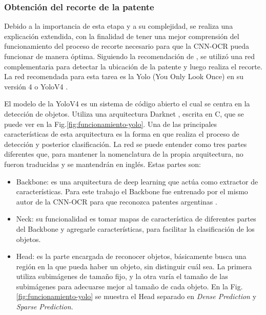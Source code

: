 \subsubsection{Obtención del recorte de la patente}

Debido a la importancia de esta etapa y a su complejidad, se realiza una explicación extendida, con la finalidad de tener una mejor comprensión del funcionamiento del proceso de recorte necesario para que la CNN-OCR pueda funcionar de manera óptima. Siguiendo la recomendación de \cite{ankandrew_reconocedor_2023}, se utilizó una red complementaria para detectar la ubicación de la patente y luego realiza el recorte. La red recomendada para esta tarea es la Yolo (You Only Look Once) en su versión 4 o YoloV4 \cite{bochkovskiy_yolov4_2020}.

El modelo de la YoloV4 es un sistema de código abierto el cual se centra en la detección de objetos. Utiliza una arquitectura Darknet \cite{noauthor_darknet_nodate}, escrita en C, que se puede ver en la Fig.\ref{fig:funcionamiento-yolo}.
Una de las principales características de esta arquitectura es la forma en que realiza el proceso de detección y posterior clasificación. La red se puede entender como tres partes diferentes que, para mantener la nomenclatura de la propia arquitectura, no fueron traducidas y se mantendrán en inglés. Estas partes son:

\begin{itemize}
    \item Backbone: es una arquitectura de deep learning que actúa como extractor de características.
          Para este trabajo el Backbone fue entrenado por el mismo autor de la CNN-OCR para que reconozca patentes argentinas \cite{ankandrew_localizador_2021}.
    \item Neck: su funcionalidad es tomar mapas de característica de diferentes partes del Backbone y agregarle características, para facilitar la clasificación de los objetos.

    \item Head: es la parte encargada de reconocer objetos, básicamente busca una región en la que pueda haber un objeto, sin distinguir cuál sea. La primera utiliza subimágenes de tamaño fijo, y la otra varía el tamaño de las subimágenes para adecuarse mejor al tamaño de cada objeto.
          En la Fig. \ref{fig:funcionamiento-yolo} se muestra el Head separado en \textit{Dense Prediction} y \textit{Sparse Prediction}.
\end{itemize}

